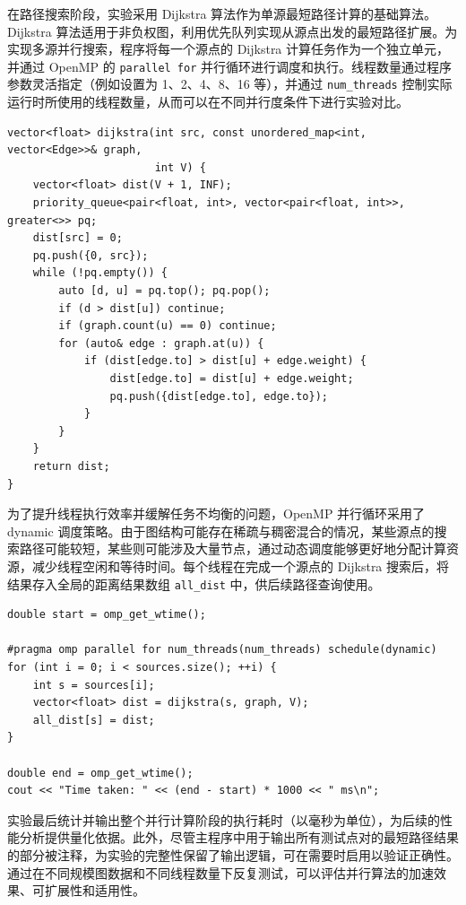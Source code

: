 \documentclass[a4paper, utf8]{ctexart}
\begin{document}
	在路径搜索阶段，实验采用 Dijkstra 算法作为单源最短路径计算的基础算法。Dijkstra 算法适用于非负权图，利用优先队列实现从源点出发的最短路径扩展。为实现多源并行搜索，程序将每一个源点的 Dijkstra 计算任务作为一个独立单元，并通过 OpenMP 的 \verb|parallel for| 并行循环进行调度和执行。线程数量通过程序参数灵活指定（例如设置为 1、2、4、8、16 等），并通过 \verb|num_threads| 控制实际运行时所使用的线程数量，从而可以在不同并行度条件下进行实验对比。
	
	\begin{verbatim}
vector<float> dijkstra(int src, const unordered_map<int, vector<Edge>>& graph,
                       int V) {
    vector<float> dist(V + 1, INF);
    priority_queue<pair<float, int>, vector<pair<float, int>>, greater<>> pq;
    dist[src] = 0;
    pq.push({0, src});
    while (!pq.empty()) {
        auto [d, u] = pq.top(); pq.pop();
        if (d > dist[u]) continue;
        if (graph.count(u) == 0) continue;
        for (auto& edge : graph.at(u)) {
            if (dist[edge.to] > dist[u] + edge.weight) {
                dist[edge.to] = dist[u] + edge.weight;
                pq.push({dist[edge.to], edge.to});
            }
        }
    }
    return dist;
}
	\end{verbatim}
	
	为了提升线程执行效率并缓解任务不均衡的问题，OpenMP 并行循环采用了 dynamic 调度策略。由于图结构可能存在稀疏与稠密混合的情况，某些源点的搜索路径可能较短，某些则可能涉及大量节点，通过动态调度能够更好地分配计算资源，减少线程空闲和等待时间。每个线程在完成一个源点的 Dijkstra 搜索后，将结果存入全局的距离结果数组 \verb|all_dist| 中，供后续路径查询使用。
	
	\begin{verbatim}
double start = omp_get_wtime();

#pragma omp parallel for num_threads(num_threads) schedule(dynamic)
for (int i = 0; i < sources.size(); ++i) {
    int s = sources[i];
    vector<float> dist = dijkstra(s, graph, V);
    all_dist[s] = dist;
}

double end = omp_get_wtime();
cout << "Time taken: " << (end - start) * 1000 << " ms\n";
	\end{verbatim}
	
	实验最后统计并输出整个并行计算阶段的执行耗时（以毫秒为单位），为后续的性能分析提供量化依据。此外，尽管主程序中用于输出所有测试点对的最短路径结果的部分被注释，为实验的完整性保留了输出逻辑，可在需要时启用以验证正确性。通过在不同规模图数据和不同线程数量下反复测试，可以评估并行算法的加速效果、可扩展性和适用性。
	
\end{document}
